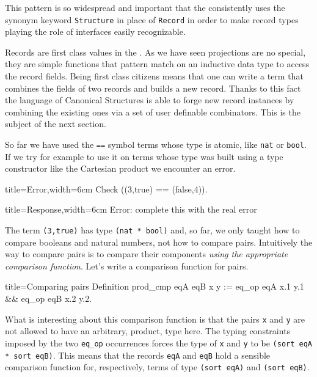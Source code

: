 This pattern is so widespread and important that the \mcbMC{}
consistently uses the synonym keyword \lstinline/Structure/ in place of
\lstinline/Record/ in order to make record types playing the role
of interfaces easily recognizable.

Records are first class values in the \mcbCIC{}.  As we have seen
projections are no special, they are simple functions that pattern
match on an inductive data type to access the record fields.  Being
first class citizens means that one can write a term that combines
the fields of two records and builds a new record.  Thanks to this
fact the language of Canonical Structures is able to forge
new record instances by combining the existing ones via a set
of user definable combinators.  This is the subject of the next
section.

\label{sec:receqtype}

So far we have used the \lstinline/==/ symbol terms whose type is
atomic, like \lstinline/nat/ or \lstinline/bool/.  If we try for
example to use it on terms whose type was built using a type
constructor like the Cartesian product we encounter an error.

\begin{coq}{title=Error,width=6cm}
Check ((3,true) == (false,4)).
$~$
\end{coq}
\begin{coqout}{title=Response,width=6cm}
Error: complete this
with the real error
\end{coqout}

The term \lstinline/(3,true)/ has type \lstinline/(nat * bool)/ and,
so far, we only taught \Coq{} how to compare booleans and natural
numbers, not how to compare pairs.
Intuitively the way to compare pairs is to compare their components
\emph{using the appropriate comparison function}.
Let's write a comparison function for pairs. 

\begin{coq}{title=Comparing pairs}
Definition prod_cmp eqA eqB x y :=
  eq_op eqA x.1 y.1 && eq_op eqB x.2 y.2.
\end{coq}

What is interesting about this comparison function is that the
pairs \lstinline/x/ and \lstinline/y/ are not allowed to have
an arbitrary, product, type here.  The typing constraints imposed
by the two \lstinline/eq_op/ occurrences forces the type of
\lstinline/x/ and \lstinline/y/ to be
\lstinline/(sort eqA * sort eqB)/.  This means
that the records \lstinline/eqA/ and \lstinline/eqB/ hold
a sensible comparison function for, respectively, terms of
type \lstinline/(sort eqA)/ and \lstinline/(sort eqB)/.

